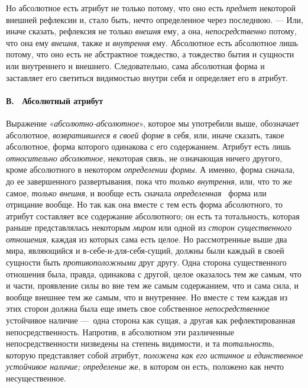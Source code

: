 Но абсолютное есть атрибут не только потому, что оно есть
{\em предмет} некоторой внешней рефлексии и, стало
быть, нечто определенное через последнюю. — Или, иначе сказать, рефлексия
не только {\em внешня} ему, а она,
{\em непосредственно} потому, что она ему
{\em внешня}, также и
{\em внутрення} ему. Абсолютное есть абсолютное лишь
потому, что оно есть не абстрактное тождество, а тождество бытия и сущности
или внутреннего и внешнего. Следовательно, сама абсолютная форма и
заставляет его светиться видимостью внутри себя и определяет его в атрибут.

\paragraph[В. \ Абсолютный атрибут]{В. \ Абсолютный атрибут}
\hypertarget{Toc478978761}{}Выражение
«{\em абсолютно-абсолютное}», которое мы употребили
выше, обозначает абсолютное, {\em возвратившееся в
своей форме} в себя, или, иначе сказать, такое абсолютное, форма которого
одинакова с его содержанием. Атрибут есть лишь
{\em относительно абсолютное}, некоторая связь, не
означающая ничего другого, кроме абсолютного в некотором
{\em определении формы}. А именно, форма сначала, до ее
завершенного развертывания, пока что {\em только
внутрення}, или, что то же самое, {\em только внешня},
и вообще есть сначала {\em определенная} \ форма или
отрицание вообще. Но так как она вместе с тем есть форма абсолютного, то
атрибут составляет все содержание абсолютного; он есть та тотальность,
которая раньше представлялась некоторым {\em миром} или
одной из {\em сторон существенного отношения}, каждая
из которых сама есть целое. Но рассмотренные выше два мира, являющийся и
в-себе-и-для-себя-сущий, должны были каждый в своей сущности быть
{\em противоположными} друг другу. Одна сторона
существенного отношения была, правда, одинакова с другой, целое оказалось
тем же самым, что и части, проявление силы во вне тем же самым содержанием,
что и сама сила, и вообще внешнее тем же самым, что и внутреннее. Но вместе
с тем каждая из этих сторон должна была еще иметь свое собственное
{\em непосредственное} устойчивое наличие —~одна
сторона как сущая, а другая как рефлектированная непосредственность.
Напротив, в абсолютном эти различенные непосредственности низведены на
степень видимости, и та {\em тотальность}, которую
представляет собой атрибут, {\em положена как его
истинное и единственное устойчивое наличие; определение} же, в котором он
есть, положено как нечто несущественное.

